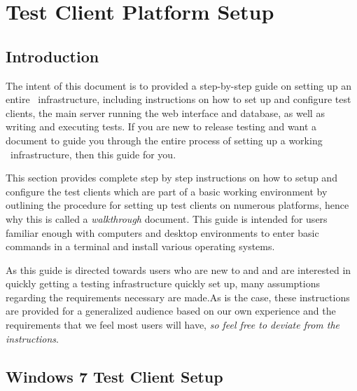 \chapter{\cernvmreleasetesting Test Client Platform Setup}
\label{sec:testclientsetup}

\section{Introduction}
The intent of this document is to provided a step-by-step guide on setting up an entire \cernvmreleasetesting\ infrastructure, including 
instructions on how to set up and configure test clients, the main server running the web interface and database, as well as writing and 
executing tests. If you are new to release testing and want a document to guide you through the entire process of setting up a working
 \cernvmreleasetesting\ infrastructure, then this guide for you.

This section provides complete step by step instructions on how to setup and configure the test clients which are part of a basic working
\releasetesting environment by outlining the procedure for setting up test clients on numerous platforms, hence why this is called a 
\emph{walkthrough} document. This guide is intended for users familiar enough with computers and desktop environments to enter basic commands
in a terminal and install various operating systems. 

As this guide is directed towards users who are new to \cernvmreleasetesting and \tapper and
are interested in quickly getting a \cernvm testing infrastructure quickly set up, many assumptions regarding the requirements necessary are 
made.As is the case, these instructions are provided for a generalized audience based on our own experience and the requirements that we feel 
most users will have, \emph{so feel free to deviate from the instructions}. 




\newpage
\section{Windows 7 Test Client Setup}
